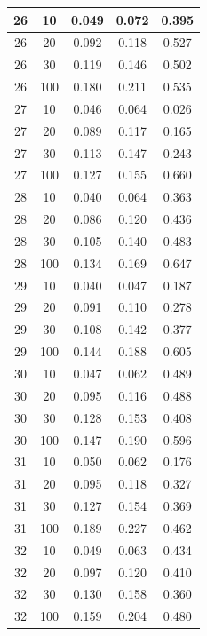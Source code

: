 \begin{longtable}{ |c|c|c|c|c| }
            26 & 10 & 0.049 & 0.072 & 0.395 \\ \hline
            26 & 20 & 0.092 & 0.118 & 0.527 \\ \hline
            26 & 30 & 0.119 & 0.146 & 0.502 \\ \hline
            26 & 100 & 0.180 & 0.211 & 0.535 \\ \hline
            27 & 10 & 0.046 & 0.064 & 0.026 \\ \hline
            27 & 20 & 0.089 & 0.117 & 0.165 \\ \hline
            27 & 30 & 0.113 & 0.147 & 0.243 \\ \hline
            27 & 100 & 0.127 & 0.155 & 0.660 \\ \hline
            28 & 10 & 0.040 & 0.064 & 0.363 \\ \hline
            28 & 20 & 0.086 & 0.120 & 0.436 \\ \hline
            28 & 30 & 0.105 & 0.140 & 0.483 \\ \hline
            28 & 100 & 0.134 & 0.169 & 0.647 \\ \hline
            29 & 10 & 0.040 & 0.047 & 0.187 \\ \hline
            29 & 20 & 0.091 & 0.110 & 0.278 \\ \hline
            29 & 30 & 0.108 & 0.142 & 0.377 \\ \hline
            29 & 100 & 0.144 & 0.188 & 0.605 \\ \hline
            30 & 10 & 0.047 & 0.062 & 0.489 \\ \hline
            30 & 20 & 0.095 & 0.116 & 0.488 \\ \hline
            30 & 30 & 0.128 & 0.153 & 0.408 \\ \hline
            30 & 100 & 0.147 & 0.190 & 0.596 \\ \hline
            31 & 10 & 0.050 & 0.062 & 0.176 \\ \hline
            31 & 20 & 0.095 & 0.118 & 0.327 \\ \hline
            31 & 30 & 0.127 & 0.154 & 0.369 \\ \hline
            31 & 100 & 0.189 & 0.227 & 0.462 \\ \hline
            32 & 10 & 0.049 & 0.063 & 0.434 \\ \hline
            32 & 20 & 0.097 & 0.120 & 0.410 \\ \hline
            32 & 30 & 0.130 & 0.158 & 0.360 \\ \hline
            32 & 100 & 0.159 & 0.204 & 0.480 \\ \hline

\end{longtable}
